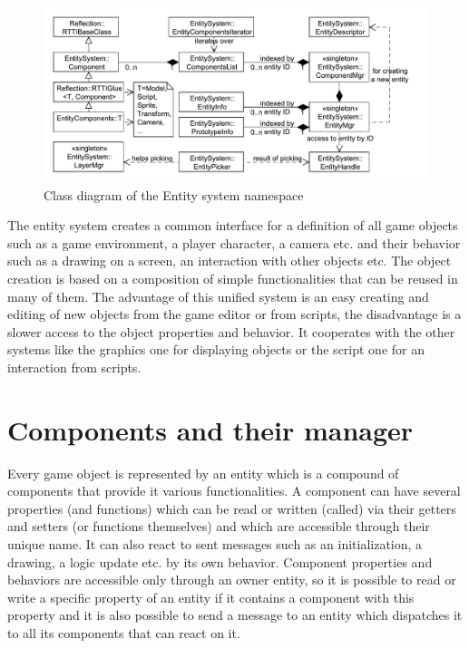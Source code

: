 \documentclass[a4paper, 12pt]{report}
\begin{document}
\begin{figure}[htbp]
	\centering
		\includegraphics[width=1\textwidth]{EntitySystemClassDiagram.pdf}
	\caption{Class diagram of the Entity system namespace}
	\label{fig:entitysystem-diagram}
\end{figure}

The entity system creates a common interface for a definition of all game objects such as a game environment, a player character, a camera etc. and their behavior such as a drawing on a screen, an interaction with other objects etc. The object creation is based on a composition of simple functionalities that can be reused in many of them. The advantage of this unified system is an easy creating and editing of new objects from the game editor or from scripts, the disadvantage is a slower access to the object properties and behavior. It cooperates with the other systems like the graphics one for displaying objects or the script one for an interaction from scripts.

\section{Components and their manager}

Every game object is represented by an entity which is a compound of components that provide it various functionalities. A component can have several properties (and functions) which can be read or written (called) via their getters and setters (or functions themselves) and which are accessible through their unique name. It can also react to sent messages such as an initialization, a drawing, a logic update etc. by its own behavior. Component properties and behaviors are accessible only through an owner entity, so it is possible to read or write a specific property of an entity if it contains a component with this property and it is also possible to send a message to an entity which dispatches it to all its components that can react on it.
\end{document}
